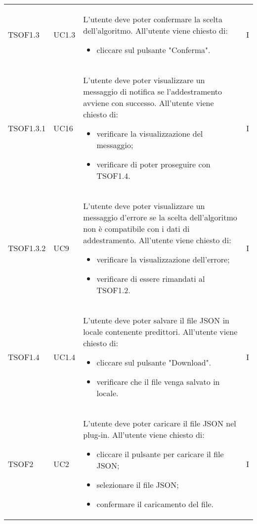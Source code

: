 \begin{longtable}{C{2.5cm} C{2.5cm} L{8cm} C{2cm}}
TSOF1.3 & UC1.3 & 
L'utente deve poter confermare la scelta dell'algoritmo. \newline All'utente viene chiesto di:
\begin{itemize}
	\item cliccare sul pulsante "Conferma".
\end{itemize} & I \\

TSOF1.3.1 & UC16 & 
L'utente deve poter visualizzare un messaggio di notifica se l'addestramento avviene con successo. \newline All'utente viene chiesto di:
\begin{itemize}
	\item verificare la visualizzazione del messaggio;
	\item verificare di poter proseguire con TSOF1.4.
\end{itemize} & I \\

TSOF1.3.2 & UC9 & 
L'utente deve poter visualizzare un messaggio d'errore se la scelta dell'algoritmo non è compatibile con i dati di addestramento. \newline All'utente viene chiesto di:
\begin{itemize}
	\item verificare la visualizzazione dell'errore;
	\item verificare di essere rimandati al TSOF1.2.
\end{itemize} & I \\

TSOF1.4 & UC1.4 & 
L'utente deve poter salvare il file JSON in locale contenente predittori. \newline All'utente viene chiesto di:
\begin{itemize}
	\item cliccare sul pulsante "Download".
	\item verificare che il file venga salvato in locale.
\end{itemize} & I \\


TSOF2 & UC2 &
L'utente  deve poter caricare il file JSON nel plug-in. \newline All'utente viene chiesto di:
\begin{itemize}
	\item cliccare il pulsante per caricare il file JSON;
	\item selezionare il file JSON;
	\item confermare il caricamento del file.
\end{itemize} & I	\\


\end{longtable}
